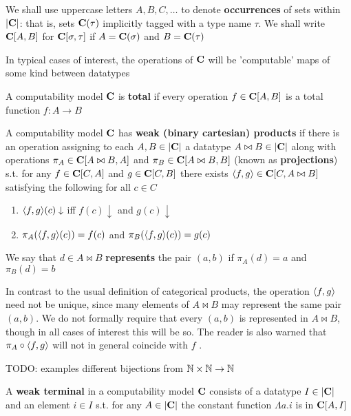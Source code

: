 \documentclass[11pt]{article}
\begin{document}
We shall use uppercase letters \(A,B,C,\dots\) to denote \textbf{occurrences} of sets within \(\abs{\bC}\):
that is, sets \(\operatorname{\textbf{C}}(\tau)\) implicitly tagged with a type name \(\tau\). We shall write \(\operatorname{\textbf{C}}[A,B]\)
for \(\operatorname{\textbf{C}}[\sigma,\tau]\) if \(A=\operatorname{\textbf{C}}(\sigma)\) and \(B=\operatorname{\textbf{C}}(\tau)\)

In typical cases of interest, the operations of \(\operatorname{\textbf{C}}\) will be 'computable' maps of some kind between datatypes

\begin{definition}[]
A computability model \(\operatorname{\textbf{C}}\) is \textbf{total} if every operation \(f\in\operatorname{\textbf{C}}[A,B]\) is a total
function \(f:A\to B\)
\end{definition}

\begin{definition}[]
A computability model \(\operatorname{\textbf{C}}\) has \textbf{weak (binary cartesian) products} if there is an operation
assigning to each \(A,B\in\abs{\bC}\) a datatype \(A\bowtie B\in\abs{\bC}\) along with
operations \(\pi_A\in\operatorname{\textbf{C}}[A\bowtie B,A]\) and \(\pi_B\in\operatorname{\textbf{C}}[A\bowtie B,B]\) (known as \textbf{projections}) s.t. for
any \(f\in\operatorname{\textbf{C}}[C,A]\) and \(g\in\operatorname{\textbf{C}}[C,B]\) there exists \(\langle f,g\rangle\in\operatorname{\textbf{C}}[C,A\bowtie B]\) satisfying the following for
all \(c\in C\)
\begin{enumerate}
\item \(\langle f,g\rangle(c)\downarrow\) iff \(f(c)\downarrow\) and \(g(c)\downarrow\)
\item \(\pi_A(\langle f,g\rangle(c))=f(c)\) and \(\pi_B(\langle f,g\rangle(c))=g(c)\)
\end{enumerate}


We say that \(d\in A\bowtie B\) \textbf{represents} the pair \((a,b)\) if \(\pi_A(d)=a\) and \(\pi_B(d)=b\)
\end{definition}

In contrast to the usual definition of categorical products, the operation \(\langle f,g\rangle\) need not be
unique, since many elements of \(A\bowtie B\) may represent the same pair \((a,b)\). We do not formally
require that every \((a,b)\) is represented in \(A\bowtie B\), though in all cases of interest this will be
so. The reader is also warned that \(\pi_A\circ\langle f,g\rangle\) will not in general coincide with \(f\) .

TODO: examples
different bijections from \(\mathbb{N}\times\mathbb{N}\to\mathbb{N}\)

\begin{definition}[]
A \textbf{weak terminal} in a computability model \(\operatorname{\textbf{C}}\) consists of a datatype \(I\in\abs{\bC}\) and an
element \(i\in I\) s.t. for any \(A\in\abs{\bC}\) the constant function \(\Lambda a.i\) is in \(\operatorname{\textbf{C}}[A,I]\)
\end{definition}
\end{document}
